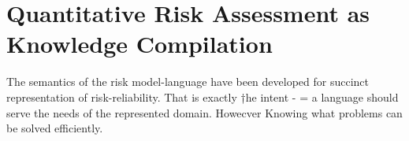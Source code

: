 \chapter{Quantitative Risk Assessment as Knowledge Compilation}
The semantics of the risk model-language have been developed for succinct representation of risk-reliability. That is exactly †he intent - = a language should serve the needs of the represented domain. Howecver
Knowing what problems can be solved efficiently.







